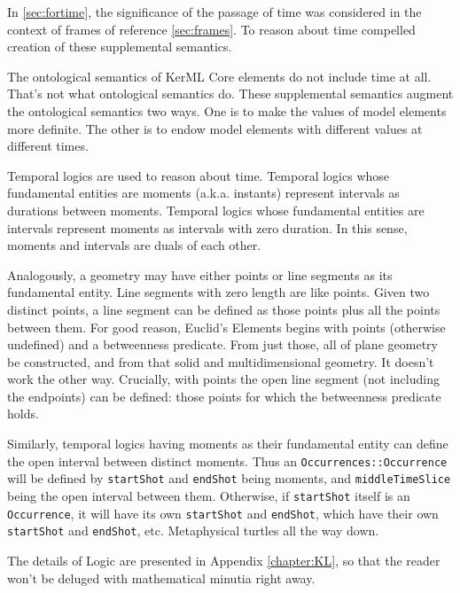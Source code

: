
\pn In \ref{sec:fortime}, the significance of the passage of time was considered in the context of frames of reference \ref{sec:frames}.
To reason about time compelled creation of these supplemental semantics.

\pn The ontological semantics of KerML Core elements do not include time at all.  That's not what ontological semantics do.  These supplemental semantics augment the ontological semantics two ways.  One is to make the values of model elements more definite.  The other is to endow model elements with different values at different times.

\pn Temporal logics are used to reason about time.  Temporal logics whose fundamental entities are moments (a.k.a. instants) represent intervals as durations between moments.  Temporal logics whose fundamental entities are intervals represent moments as intervals with zero duration.  In this sense, moments and intervals are duals of each other.

\pn Analogously, a geometry may have either points or line segments as its fundamental entity.  Line segments with zero length are like points.
Given two distinct points, a line segment can be defined as those points plus all the points between them.  For good reason, Euclid's Elements begins with points (otherwise undefined) and a betweenness predicate.  From just those, all of plane geometry be constructed, and from that solid and multidimensional geometry.  It doesn't work the other way.  Crucially, with points the open line segment (not including the endpoints) can be defined:  those points for which the betweenness predicate holds.

\pn Similarly, temporal logics having moments as their fundamental entity can define the open interval between distinct moments.
Thus an \texttt{Occurrences::Occurrence} will be defined by \texttt{startShot} and \texttt{endShot} being moments, and \texttt{middleTimeSlice} being the open interval between them.  
Otherwise, if  \texttt{startShot} itself is an \texttt{Occurrence}, it will have its own \texttt{startShot} and \texttt{endShot}, which have their own \texttt{startShot} and \texttt{endShot}, etc.   Metaphysical turtles all the way down.

\pn The details of \logicid Logic are presented in Appendix \ref{chapter:KL}, so that the reader won't be deluged with mathematical minutia right away.


